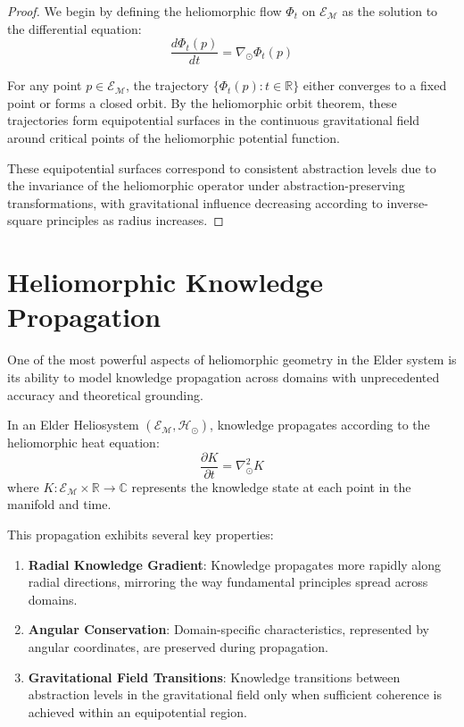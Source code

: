 \begin{proof}
We begin by defining the heliomorphic flow $\Phi_t$ on $\mathcal{E}_{\mathcal{M}}$ as the solution to the differential equation:
\begin{equation}
\frac{d\Phi_t(p)}{dt} = \nabla_{\odot} \Phi_t(p)
\end{equation}

For any point $p \in \mathcal{E}_{\mathcal{M}}$, the trajectory $\{\Phi_t(p) : t \in \mathbb{R}\}$ either converges to a fixed point or forms a closed orbit. By the heliomorphic orbit theorem, these trajectories form equipotential surfaces in the continuous gravitational field around critical points of the heliomorphic potential function.

These equipotential surfaces correspond to consistent abstraction levels due to the invariance of the heliomorphic operator under abstraction-preserving transformations, with gravitational influence decreasing according to inverse-square principles as radius increases.
\end{proof}

\section{Heliomorphic Knowledge Propagation}

One of the most powerful aspects of heliomorphic geometry in the Elder system is its ability to model knowledge propagation across domains with unprecedented accuracy and theoretical grounding.

\begin{proposition}
In an Elder Heliosystem $(\mathcal{E}_{\mathcal{M}}, \mathcal{H}_{\odot})$, knowledge propagates according to the heliomorphic heat equation:
\begin{equation}
\frac{\partial K}{\partial t} = \nabla_{\odot}^2 K
\end{equation}
where $K: \mathcal{E}_{\mathcal{M}} \times \mathbb{R} \rightarrow \mathbb{C}$ represents the knowledge state at each point in the manifold and time.
\end{proposition}

This propagation exhibits several key properties:

\begin{enumerate}
    \item \textbf{Radial Knowledge Gradient}: Knowledge propagates more rapidly along radial directions, mirroring the way fundamental principles spread across domains.
    
    \item \textbf{Angular Conservation}: Domain-specific characteristics, represented by angular coordinates, are preserved during propagation.
    
    \item \textbf{Gravitational Field Transitions}: Knowledge transitions between abstraction levels in the gravitational field only when sufficient coherence is achieved within an equipotential region.
\end{enumerate}

